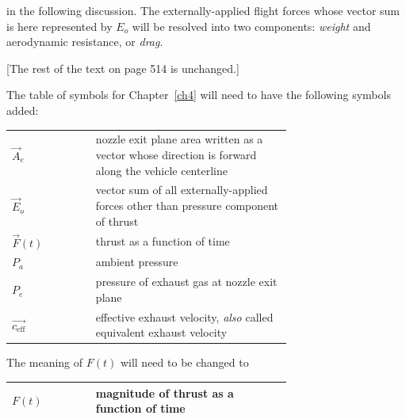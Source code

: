 \noindent in the following discussion. The externally-applied flight forces whose vector sum is here
represented by $E_o$ will be resolved into two components: \emph{weight} and aerodynamic resistance, or
\emph{drag}.

\begin{center}
[The rest of the text on page 514 is unchanged.]
\end{center}

\bigskip
The table of symbols for Chapter~\ref{ch4} will need to have the following symbols added:
\begin{center}
\begin{tabular}{@{}l p{0.7\linewidth}@{}}
\toprule
$\vec{A}_e$ & nozzle exit plane area written as a vector whose direction is forward along the vehicle
  centerline \\
$\vec{E}_o$ & vector sum of all externally-applied forces other than pressure component of thrust \\
$\vec{F}(t)$ & thrust as a function of time \\
$P_a$ & ambient pressure \\
$P_e$ & pressure of exhaust gas at nozzle exit plane \\
$\overrightarrow{c_{\mathrm{eff}}}$ & effective exhaust velocity, \emph{also} called equivalent exhaust velocity \\
\bottomrule
\end{tabular}
\end{center}
The meaning of $F(t)$ will need to be changed to
\begin{center}
\begin{tabular}{@{}l p{0.7\linewidth}@{}}
\toprule
$F(t)$ & magnitude of thrust as a function of time \\
\bottomrule
\end{tabular}
\end{center}
